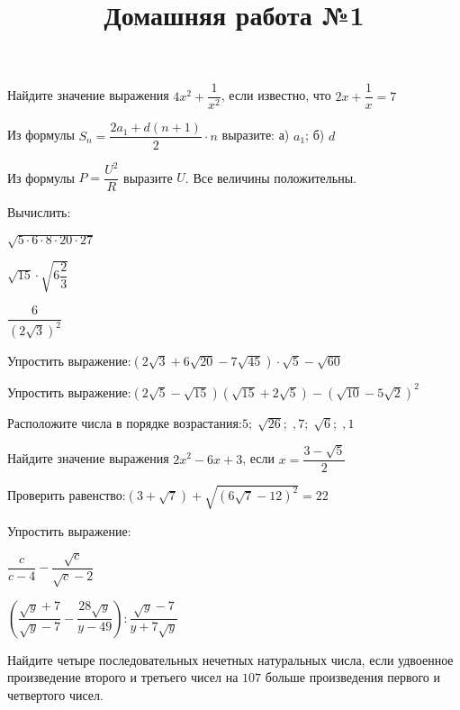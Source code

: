 \begin{listofex}
	\item {}
	\item {}
	\item Найдите значение выражения \( 4x^2+\dfrac{1}{x^2} \), если известно, что \( 2x+\dfrac{1}{x}=7 \)
	\item Из формулы \( S_n=\dfrac{2a_1+d(n+1)}{2}\cdot n \) выразите: а) \( a_1 \); б) \( d \)
	\item Из формулы \( P=\dfrac{U^2}{R} \) выразите \( U \). Все величины положительны.
	\item Вычислить:
	\begin{enumcols}[itemcolumns=3]
		\item \( \sqrt{5\cdot6\cdot8\cdot20\cdot27} \)
		\item \( \sqrt{15}\cdot\sqrt{6\dfrac{2}{3}} \)
		\item \( \dfrac{6}{(2\sqrt{3})^2} \)
	\end{enumcols}
	\item Упростить выражение:\quad\( (2\sqrt{3}+6\sqrt{20}-7\sqrt{45})\cdot\sqrt{5}-\sqrt{60} \)
	\item Упростить выражение:\quad\( (2\sqrt{5}-\sqrt{15})(\sqrt{15}+2\sqrt{5})-(\sqrt{10}-5\sqrt{2})^2 \)
	\item Расположите числа в порядке возрастания:\quad\( 5;\;\sqrt{26};\;,7;\;\sqrt{6};\;,1 \)
	\item Найдите значение выражения \( 2x^2-6x+3 \), если \( x=\dfrac{3-\sqrt{5}}{2} \)
	\item Проверить равенство:\quad\( (3+\sqrt{7})+\sqrt{(6\sqrt{7}-12)^2}=22 \)
	\item Упростить выражение:
	\begin{enumcols}[itemcolumns=2]
		\item \( \dfrac{c}{c-4}-\dfrac{\sqrt{c}}{\sqrt{c}-2} \)
		\item \( \left( \dfrac{\sqrt{y}+7}{\sqrt{y}-7}-\dfrac{28\sqrt{y}}{y-49} \right):\dfrac{\sqrt{y}-7}{y+7\sqrt{y}} \)
	\end{enumcols}
	\item Найдите четыре последовательных нечетных натуральных числа, если удвоенное
	произведение второго и третьего чисел на \( 107 \) больше произведения первого и четвертого
	чисел.
\end{listofex}
\newpage
\title{Домашняя работа №1}
